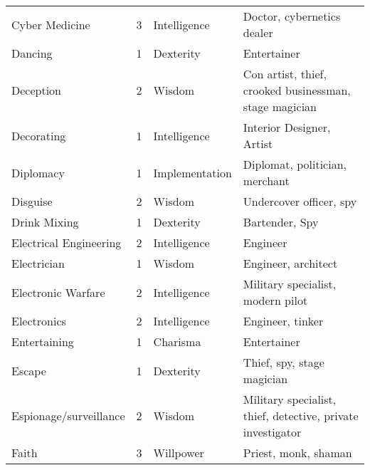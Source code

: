 \documentclass[twoside]{book}
\begin{document}
\begin{longtable}{p{1.25in}llp{12em}}
  \raggedright
           Cyber Medicine 
  &
   3 
  &
   Intelligence 
  &
   Doctor, cybernetics
           dealer 
  \tabularnewline
      
  \raggedright
           Dancing 
  &
   1 
  &
   Dexterity 
  &
   Entertainer 
  \tabularnewline
      
  \raggedright
           Deception 
  &
   2 
  &
   Wisdom 
  &
   Con artist, thief,
           crooked businessman, stage magician 
  \tabularnewline
      
  \raggedright
           Decorating 
  &
   1 
  &
   Intelligence 
  &
   Interior Designer, Artist
           
  \tabularnewline
      
  \raggedright
           Diplomacy 
  &
   1 
  &
   Implementation 
  &
   Diplomat, politician,
           merchant 
  \tabularnewline
      
  \raggedright
           Disguise 
  &
   2 
  &
   Wisdom 
  &
   Undercover officer, spy
           
  \tabularnewline
      
  \raggedright
           Drink Mixing 
  &
   1 
  &
   Dexterity 
  &
   Bartender, Spy 
  \tabularnewline
      
  \raggedright
           Electrical Engineering 
  &
   2 
  &
   Intelligence 
  &
   Engineer 
  \tabularnewline
      
  \raggedright
           Electrician 
  &
   1 
  &
   Wisdom 
  &
   Engineer, architect
           
  \tabularnewline
      
  \raggedright
           Electronic Warfare 
  &
   2 
  &
   Intelligence 
  &
   Military specialist,
           modern pilot 
  \tabularnewline
      
  \raggedright
           Electronics 
  &
   2 
  &
   Intelligence 
  &
   Engineer, tinker 
  \tabularnewline
      
  \raggedright
           Entertaining 
  &
   1 
  &
   Charisma 
  &
   Entertainer 
  \tabularnewline
      
  \raggedright
           Escape 
  &
   1 
  &
   Dexterity 
  &
   Thief, spy, stage
           magician 
  \tabularnewline
      
  \raggedright
           Espionage/surveillance 
  &
   2 
  &
   Wisdom 
  &
   Military specialist,
           thief, detective, private investigator 
  \tabularnewline
      
  \raggedright
           Faith 
  &
   3 
  &
   Willpower 
  &
   Priest, monk, shaman
           

\end{longtable}
\end{document}
